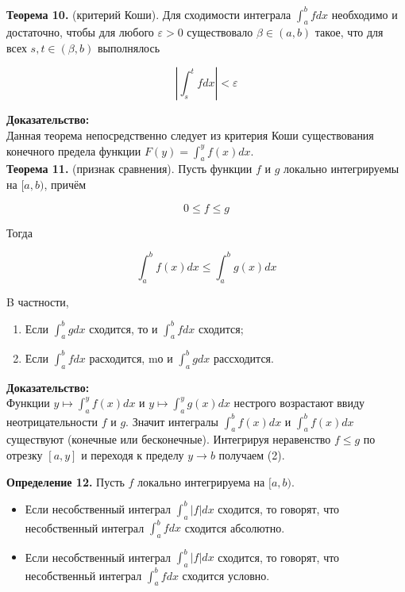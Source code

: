 \documentclass[a4paper,12pt]{article} %
\begin{document}
	\textbf{Теорема 10.} (критерий Коши). Для сходимости интеграла $\int_{a}^{b} f d x$ необходимо и достаточно, чтобы для любого $\varepsilon>0$ существовало $\beta \in(a, b)$ такое, что для всех $s, t \in(\beta, b)$ выполнялось
	
	$$
	\left|\int_{s}^{t} f d x\right|<\varepsilon
	$$
	
	\textbf{Доказательство:\\}
	Данная теорема непосредственно следует из критерия Коши существования конечного предела функции $F(y)=\int_{a}^{y} f(x) d x$.\\
 \textbf{Теорема 11.} (признак сравнения). Пусть функции $f$ и $g$ локально интегрируемы на $[a, b)$, причём
	
	$$
	0 \leq f \leq g
	$$
	
	Тогда
	
	$$
	\int_{a}^{b} f(x) d x \leq \int_{a}^{b} g(x) d x
	$$
	
	B частности,
	
	\begin{enumerate}
		\item Если $\int_{a}^{b} g d x$ сходится, то и $\int_{a}^{b} f d x$ сходится;
	
		\item Если $\int_{a}^{b} f d x$ расходится, mо и $\int_{a}^{b} g d x$ рассходится.
	
	\end{enumerate}
	
	\textbf{Доказательство:\\}
	Функции $y \mapsto \int_{a}^{y} f(x) d x$ и $y \mapsto \int_{a}^{y} g(x) d x$ нестрого возрастают ввиду неотрицательности $f$ и $g$. Значит интегралы $\int_{a}^{b} f(x) d x$ и $\int_{a}^{b} f(x) d x$ существуют (конечные или бесконечные). Интегрируя неравенство $f \leq g$ по отрезку $[a, y]$ и переходя к пределу $y \rightarrow b$ получаем (2).
	
	\textbf{Определение 12.} Пусть $f$ локально интегрируема на $[a, b)$.
	
	\begin{itemize}
		\item Если несобственный интеграл $\int_{a}^{b}|f| d x$ сходится, то говорят, что несобственный интеграл $\int_{a}^{b} f d x$ сходится абсолютно.
	
		\item Если несобственный интеграл $\int_{a}^{b}|f| d x$ сходится, то говорят, что несобственньй интеграл $\int_{a}^{b} f d x$ сходится условно.
	
	\end{itemize}
	
\end{document}
